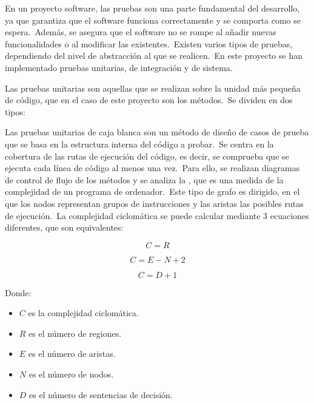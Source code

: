 En un proyecto software, las pruebas son una parte fundamental del desarrollo, ya que garantiza que el software funciona
correctamente y se comporta como se espera.\ Además, se asegura que el software no se rompe al añadir nuevas
funcionalidades o al modificar las existentes.\ Existen varios tipos de pruebas, dependiendo del nivel de abstracción
al que se realicen.\ En este proyecto se han implementado pruebas unitarias, de integración y de sistema.


Las pruebas unitarias son aquellas que se realizan sobre la unidad más pequeña de código, que en el caso de este
proyecto son los métodos.\ Se dividen en dos tipos:


Las pruebas unitarias de caja blanca son un método de diseño de casos de prueba que se basa en la estructura interna
del código a probar.\ Se centra en la cobertura de las rutas de ejecución del código, es decir, se comprueba que se
ejecuta cada línea de código al menos una vez.\ Para ello, se realizan diagramas de control de flujo de los métodos y se
analiza la , que es una medida de la complejidad de un programa de
ordenador.\ Este tipo de grafo es dirigido, en el que los
nodos representan grupos de instrucciones y las aristas las posibles rutas de ejecución.\ La complejidad ciclomática
se puede calcular mediante 3 ecuaciones diferentes, que son equivalentes:

\begin{center}
	\begin{equation}
		C = R
		\label{eq:complejidad-ciclomatica-1}
	\end{equation}

	\begin{equation}
		C = E - N + 2
		\label{eq:complejidad-ciclomatica-2}
	\end{equation}

	\begin{equation}
		C = D + 1
		\label{eq:complejidad-ciclomatica-3}
	\end{equation}
\end{center}

Donde:
\begin{itemize}
	\item $C$ es la complejidad ciclomática.
	\item $R$ es el número de regiones.
	\item $E$ es el número de aristas.
	\item $N$ es el número de nodos.
	\item $D$ es el número de sentencias de decisión.
\end{itemize}

